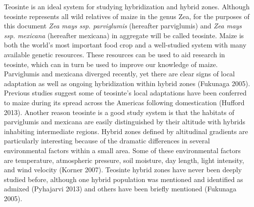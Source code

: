 \documentclass[12pt]{amsart}
\newcommand{\mbh}[1]{\textcolor{red}{ \emph{\scriptsize  #1}} }
\begin{document}
Teosinte is an ideal system for studying hybridization and hybrid zones.  
Although teosinte represents all wild relatives of maize in the genus {Zea}, for the purposes of this document \textit{Zea mays ssp. parviglumis} (hereafter parviglumis) and \textit{Zea mays ssp. mexicana} (hereafter mexicana) in aggregate will be called teosinte. 
Maize is both the world's most important food crop and a well-studied system with many available genetic resources.
These resources can be used to aid research in teosinte, which can in turn be used to improve our knowledge of maize.
Parviglumis and mexicana diverged recently, yet there are clear signs of local adaptation as well as ongoing hybridization within hybrid zones (Fukunaga 2005).
Previous studies suggest some of teosinte's local adaptations have been conferred to maize during its spread across the Americas following domestication (Hufford 2013).
Another reason teosinte is a good study system is that the habitats of parviglumis and mexicana are easily distinguished by their altitude with hybrids inhabiting intermediate regions.
Hybrid zones defined by altitudinal gradients are particularly interesting because of the dramatic differences in several environmental factors within a small area.
Some of these environmental factors are temperature, atmospheric pressure, soil moisture, day length, light intensity, and wind velocity (Korner 2007).
Teosinte hybrid zones have never been deeply studied before, although one hybrid population was mentioned and identified as admixed (Pyhajarvi 2013)  and others have been briefly mentioned (Fukunaga 2005).
\end{document}
